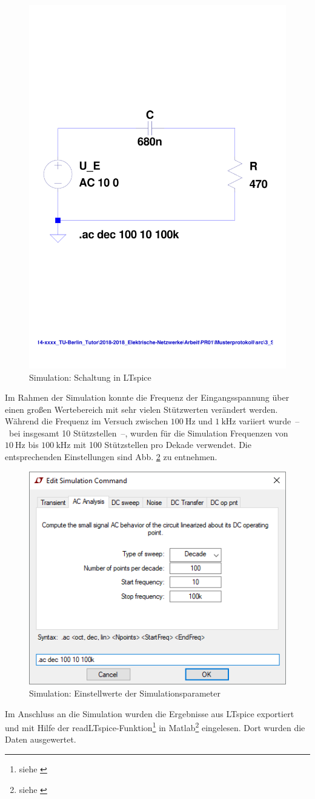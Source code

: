 %
\begin{figure}[H]
  \centering
  \includegraphics[width=0.6\linewidth]{src/3_Sim_Schaltung.pdf}
  \caption{Simulation: Schaltung in LTspice}
  \label{fig:3_Sim_Schaltung}
\end{figure}
%
Im Rahmen der Simulation konnte die Frequenz der Eingangsspannung über einen großen Wertebereich mit sehr vielen Stützwerten verändert werden. Während die Frequenz im Versuch zwischen $\SI{100}{\hertz}$ und $\SI{1}{\kilo\hertz}$ variiert wurde~--~bei insgesamt 10 Stützstellen~--, wurden für die Simulation Frequenzen von $\SI{10}{\hertz}$ bis $\SI{100}{\kilo\hertz}$ mit 100 Stützstellen pro Dekade verwendet. Die entsprechenden Einstellungen sind Abb. \ref{fig:3_Sim_Parameter} zu entnehmen.
%
\begin{figure}[H]
  \centering
  \includegraphics[width=0.7\linewidth]{src/3_Sim_Parameter.png}
  \caption{Simulation: Einstellwerte der Simulationsparameter}
  \label{fig:3_Sim_Parameter}
\end{figure}
%
Im Anschluss an die Simulation wurden die Ergebnisse aus LTspice exportiert und mit Hilfe der readLTspice-Funktion\footnote{siehe \cite{src:readLTspice}} in Matlab\footnote{siehe \cite{src:Matlab}} eingelesen. Dort wurden die Daten ausgewertet.
%
%
%